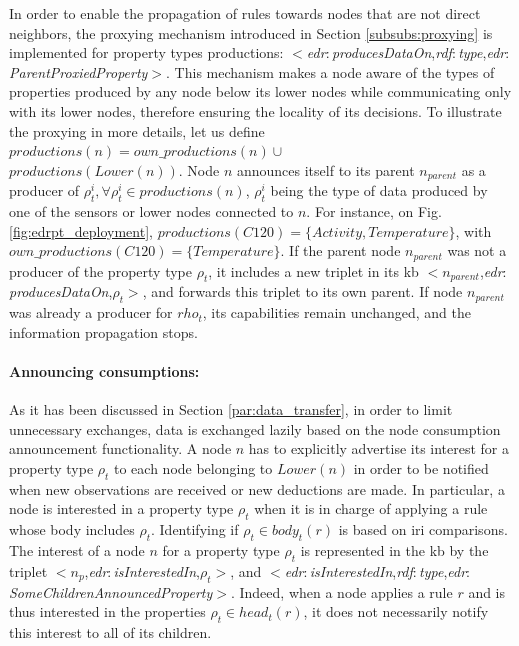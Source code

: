 \documentclass{iosart2c}
\newcommand{\namespace}[1]{\textit{#1$:$}}
\newcommand{\concept}[2]{\namespace{#1}\-\textit{#2}}
\newcommand{\triplet}[3]{$<$#1,\textit{#2},#3$>$}
\begin{document}
In order to enable the propagation of rules towards nodes that are not direct neighbors, the proxying mechanism introduced in Section \textsection \ref{subsubs:proxying} is implemented for property types productions: \triplet{\concept{edr}{produces\-Data\-On}}{\concept{rdf}{type}}{\concept{edr}{Parent\-Proxied\-Property}}.
This mechanism makes a node aware of the types of properties produced by any node below its lower nodes while communicating only with its lower nodes, therefore ensuring the locality of its decisions.
To illustrate the proxying in more details, let us define $productions(n)=own\_productions(n)\cup$\\$productions(Lower(n))$. 
Node $n$ announces itself to its parent $n_{parent}$ as a producer of $\rho^{i}_t, \forall \rho^{i}_t\in productions(n)$, $\rho^{i}_t$ being the type of data produced by one of the sensors or lower nodes connected to $n$.
For instance, on Fig. \ref{fig:edrpt_deployment}, $productions(C120) = \{Activity, Temperature\}$, with\\$own\_productions(C120) = \{Temperature\}$.
If the parent node $n_{parent}$ was not a producer of the property type $\rho_t$, it includes a new triplet in its \gls{kb} \triplet{$n_{parent}$}{\concept{edr}{produces\-Data\-On}}{$\rho_t$}, and forwards this triplet to its own parent.
If node $n_{parent}$ was already a producer for $rho_t$, its capabilities remain unchanged, and the information propagation stops.

\paragraph{Announcing consumptions:}
As it has been discussed in Section \textsection \ref{par:data_transfer}, in order to limit unnecessary exchanges, data is exchanged lazily based on the node consumption announcement functionality.
A node $n$ has to explicitly advertise its interest for a property type $\rho_{t}$ to each node belonging to $Lower(n)$ in order to be notified when new observations are received or new deductions are made. 
In particular, a node is interested in a property type $\rho_{t}$ when it is in charge of applying a rule whose body includes $\rho_{t}$. 
Identifying if $\rho_t \in body_t(r)$ is based on \gls{iri} comparisons. 
The interest of a node $n$ for a property type $\rho_t$ is represented in the \gls{kb} by the triplet \triplet{$n_p$}{\concept{edr}{is\-Interested\-In}}{$\rho_t$}, and \triplet{\concept{edr}{is\-Interested\-In}}{\concept{rdf}{type}}{\concept{edr}{Some\-Children\-Announced\-Property}}.
Indeed, when a node applies a rule $r$ and is thus interested in the properties $\rho_t \in head_t(r)$, it does not necessarily notify this interest to all of its children.
\end{document}
